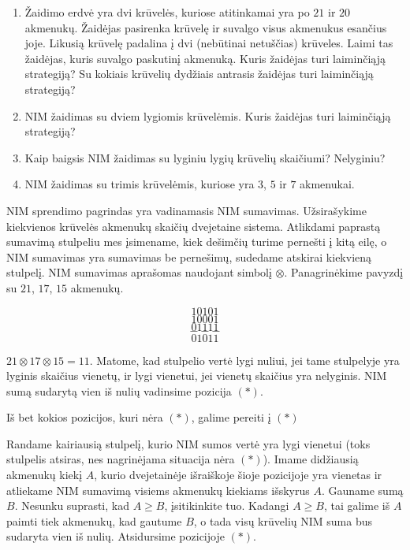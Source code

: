 \begin{enumerate}
  \item Žaidimo erdvė yra dvi krūvelės, kuriose atitinkamai yra po $21$ ir
    $20$ akmenukų. Žaidėjas pasirenka krūvelę ir suvalgo visus akmenukus
    esančius joje. Likusią krūvelę padalina į dvi (nebūtinai netuščias)
    krūveles. Laimi tas žaidėjas, kuris suvalgo paskutinį akmenuką. Kuris
    žaidėjas turi laiminčiąją strategiją? Su kokiais krūvelių dydžiais
    antrasis žaidėjas turi laiminčiąją strategiją? 
  \item NIM žaidimas su dviem lygiomis krūvelėmis. Kuris žaidėjas turi
    laiminčiąją strategiją?
  \item Kaip baigsis NIM žaidimas su lyginiu lygių krūvelių skaičiumi?
    Nelyginiu? 
  \item NIM žaidimas su trimis krūvelėmis, kuriose yra $3$, $5$ ir $7$
    akmenukai.
\end{enumerate} 

NIM sprendimo pagrindas yra vadinamasis NIM sumavimas. Užsirašykime
kiekvienos krūvelės akmenukų skaičių dvejetaine sistema. Atlikdami paprastą
sumavimą stulpeliu  mes įsimename, kiek dešimčių turime pernešti į kitą
eilę, o NIM sumavimas yra sumavimas be pernešimų, sudedame atskirai
kiekvieną stulpelį. NIM sumavimas aprašomas naudojant simbolį $\otimes$.
Panagrinėkime pavyzdį su  $21$, $17$, $15$ akmenukų. 

$$10101$$$$10001$$$$01111$$$$---$$$$01011$$

$21 \otimes 17 \otimes 15=11$. Matome, kad stulpelio vertė lygi nuliui, jei
tame stulpelyje yra lyginis skaičius vienetų, ir lygi vienetui, jei vienetų
skaičius yra nelyginis. NIM sumą sudarytą vien iš nulių vadinsime pozicija
$(*)$. 

\begin{teig}
  Iš bet kokios pozicijos, kuri nėra $(*)$, galime pereiti į  $(*)$
\end{teig}

Randame kairiausią stulpelį, kurio NIM sumos vertė yra lygi vienetui (toks
stulpelis atsiras, nes nagrinėjama situacija nėra $(*)$). Imame didžiausią
akmenukų kiekį $A$, kurio dvejetainėje išraiškoje šioje pozicijoje yra
vienetas ir atliekame NIM sumavimą visiems akmenukų kiekiams išskyrus $A$.
Gauname sumą $B$.  Nesunku suprasti, kad $A\geq B$, įsitikinkite tuo. Kadangi
$A\geq B$, tai galime iš $A$ paimti tiek akmenukų, kad gautume $B$, o tada visų
krūvelių NIM suma bus sudaryta vien iš nulių. Atsidursime pozicijoje $(*)$.

